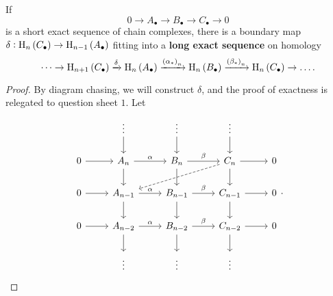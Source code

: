 \begin{proposition}
If
$$ 0 \to A_\bullet \to B_\bullet \to C_\bullet \to 0 $$
is a short exact sequence of chain complexes, there is a boundary map $ \delta : \H_n\br{C_\bullet} \to \H_{n - 1}\br{A_\bullet} $ fitting into a \textbf{long exact sequence} on homology
$$ \dots \to \H_{n + 1}\br{C_\bullet} \xrightarrow{\delta} \H_n\br{A_\bullet} \xrightarrow{\br{\alpha_*}_n} \H_n\br{B_\bullet} \xrightarrow{\br{\beta_*}_n} \H_n\br{C_\bullet} \to \dots. $$
\end{proposition}

\begin{proof}
By diagram chasing, we will construct $ \delta $, and the proof of exactness is relegated to question sheet $ 1 $. Let
$$
\begin{tikzcd}
& \vdots \arrow{d} & \vdots \arrow{d} & \vdots \arrow{d} & \\
0 \arrow{r} & A_n \arrow{r}{\alpha} \arrow{d} & B_n \arrow{r}{\beta} \arrow{d} & C_n \arrow{r} \arrow[dashed]{dll} \arrow{d} & 0 \\
0 \arrow{r} & A_{n - 1} \arrow{r}{\alpha} \arrow{d} & B_{n - 1} \arrow{r}{\beta} \arrow{d} & C_{n - 1} \arrow{r} \arrow{d} & 0 \\
0 \arrow{r} & A_{n - 2} \arrow{r}{\alpha} \arrow{d} & B_{n - 2} \arrow{r}{\beta} \arrow{d} & C_{n - 2} \arrow{r} \arrow{d} & 0 \\
& \vdots & \vdots & \vdots &
\end{tikzcd}.
$$

\pagebreak


\end{proof}
